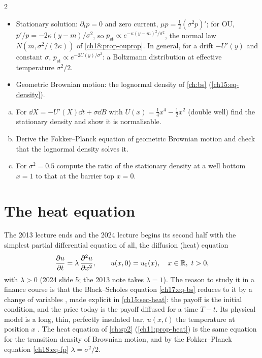 \begin{paracol}{2}
\begin{itemize}
  \item Stationary solution: $\partial_tp=0$ and zero current, $\mu p=\tfrac12(\sigma^2p)'$; for OU, $p'/p=-2\kappa(y-m)/\sigma^2$, so $p_{\mathrm{st}}\propto e^{-\kappa(y-m)^2/\sigma^2}$, the normal law $N(m,\sigma^2/(2\kappa))$ of \cref{ch18:prop-ouprop}. In general, for a drift $-U'(y)$ and constant $\sigma$, $p_{\mathrm{st}}\propto e^{-2U(y)/\sigma^2}$: a Boltzmann distribution at effective temperature $\sigma^2/2$.
  \item Geometric Brownian motion: the lognormal density of \cref{ch:bs} (\cref{ch15:eq-density}).
\end{itemize}

\begin{exercise}\label{ch18:ex-fp}
\leavevmode
\begin{enumerate}[(a)]
  \item For $\dd X=-U'(X)\dd t+\sigma\dd B$ with $U(x)=\tfrac14x^4-\tfrac12x^2$ (double well) find the stationary density and show it is normalisable.
  \item Derive the Fokker--Planck equation of geometric Brownian motion and check that the lognormal density solves it.
  \item For $\sigma^2=0.5$ compute the ratio of the stationary density at a well bottom $x=1$ to that at the barrier top $x=0$.
\end{enumerate}
\end{exercise}

\section{The heat equation}\label{ch18:sec-heat}

The 2013 lecture ends and the 2024 lecture begins its second half with the simplest partial differential equation of all, the diffusion (heat) equation 
\begin{equation}\label{ch18:eq-heat}
  \frac{\partial u}{\partial t}=\lambda\,\frac{\partial^2u}{\partial x^2},\qquad u(x,0)=u_0(x),\quad x\in\mathbb{R},\ t>0 ,
\end{equation}
with $\lambda>0$ (2024 slide 5; the 2013 note takes $\lambda=1$). The reason to study it in a finance course is that the Black--Scholes equation \eqref{ch17:eq-bs} reduces to it by a change of variables , made explicit in \cref{ch15:sec-heat}: the payoff is the initial condition, and the price today is the payoff diffused for a time $T-t$. Its physical model is a long, thin, perfectly insulated bar, $u(x,t)$ the temperature at position $x$ . The heat equation of \cref{ch:sp2} (\cref{ch11:prop-heat}) is the same equation for the transition density of Brownian motion, and by the Fokker--Planck equation \eqref{ch18:eq-fp} $\lambda=\sigma^2/2$.


\end{paracol}
